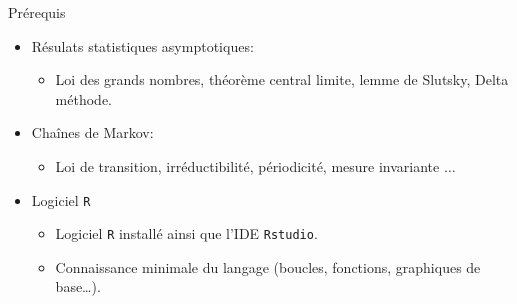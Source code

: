 \documentclass[ignorenonframetext,]{beamer}
\providecommand{\tightlist}{%
  \setlength{\itemsep}{0pt}\setlength{\parskip}{0pt}}
\begin{document}
\begin{frame}[fragile]{Prérequis}
\protect\hypertarget{pruxe9requis}{}

\begin{itemize}
\tightlist
\item
  Résulats statistiques asymptotiques:

  \begin{itemize}
  \tightlist
  \item
    Loi des grands nombres, théorème central limite, lemme de Slutsky,
    Delta méthode.
  \end{itemize}
\item
  Chaînes de Markov:

  \begin{itemize}
  \tightlist
  \item
    Loi de transition, irréductibilité, périodicité, mesure invariante
    \(\dots\)
  \end{itemize}
\item
  Logiciel \texttt{R}

  \begin{itemize}
  \tightlist
  \item
    Logiciel \texttt{R} installé ainsi que l'IDE \texttt{Rstudio}.
  \item
    Connaissance minimale du langage (boucles, fonctions, graphiques de
    base\ldots{}).
  \end{itemize}
\end{itemize}

\end{frame}
\end{document}
